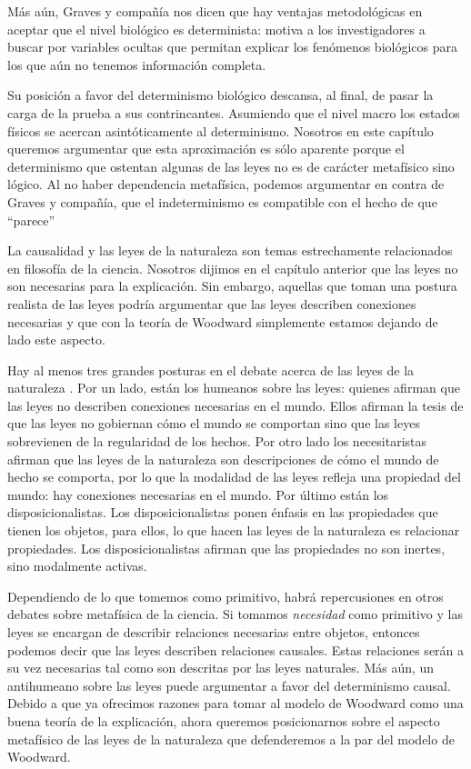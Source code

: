 Más aún, Graves y compañía nos dicen que hay ventajas metodológicas en aceptar que el nivel biológico es determinista: motiva a los investigadores a buscar por variables ocultas que permitan explicar los fenómenos biológicos para los que aún no tenemos información completa.

Su posición a favor del determinismo biológico descansa, al final, de pasar la carga de la prueba a sus contrincantes. Asumiendo que el nivel macro los estados físicos se acercan asintóticamente al determinismo. Nosotros en este capítulo queremos argumentar que esta aproximación es sólo aparente porque el determinismo que ostentan algunas de las leyes no es de carácter metafísico sino lógico. Al no haber dependencia metafísica, podemos argumentar en contra de Graves y compañía, que el indeterminismo es compatible con el hecho de que ``parece''

La causalidad y las leyes de la naturaleza son temas estrechamente relacionados en filosofía de la ciencia. Nosotros dijimos en el capítulo anterior que las leyes no son necesarias para la explicación. Sin embargo, aquellas que toman una postura realista de las leyes podría argumentar que las leyes describen conexiones necesarias y que con la teoría de Woodward simplemente estamos dejando de lado este aspecto.

Hay al menos tres grandes posturas en el debate acerca de las leyes de la naturaleza \cite{Borge2019}. Por un lado, están los humeanos sobre las leyes: quienes afirman que las leyes no describen conexiones necesarias en el mundo. Ellos afirman la tesis de que las leyes no gobiernan cómo el mundo se comportan sino que las leyes sobrevienen de la regularidad de los hechos. Por otro lado los necesitaristas afirman que las leyes de la naturaleza son descripciones de cómo el mundo de hecho se comporta, por lo que la modalidad de las leyes refleja una propiedad del mundo: hay conexiones necesarias en el mundo. Por último están los disposicionalistas. Los disposicionalistas ponen énfasis en las propiedades que tienen los objetos, para ellos, lo que hacen las leyes de la naturaleza es relacionar propiedades. Los disposicionalistas afirman que las propiedades no son inertes, sino modalmente activas.

Dependiendo de lo que tomemos como primitivo, habrá repercusiones en otros debates sobre metafísica de la ciencia. Si tomamos \emph{necesidad} como primitivo y las leyes se encargan de describir relaciones necesarias entre objetos, entonces podemos decir que las leyes describen relaciones causales. Estas relaciones serán a su vez necesarias tal como son descritas por las leyes naturales. Más aún, un antihumeano sobre las leyes puede argumentar a favor del determinismo causal. Debido a que ya ofrecimos razones para tomar al modelo de Woodward como una buena teoría de la explicación, ahora queremos posicionarnos sobre el aspecto metafísico de las leyes de la naturaleza que defenderemos a la par del modelo de Woodward.

